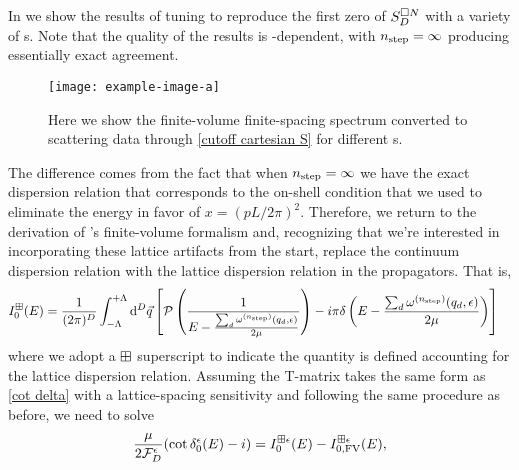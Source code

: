 In  we show the results of tuning to reproduce the first zero of $S_D^{\square N}$ with a variety of {\nstep}s.
Note that the quality of the results is \nstep-dependent, with ${n_\text{step}}=\infty$ producing essentially exact agreement.

\begin{figure}
    \texttt{[image: example-image-a]}
    \caption{Here we show the finite-volume finite-spacing spectrum converted to scattering data through \eqref{cutoff cartesian S} for different {\nstep}s.
    }
    \label{fig:results cutoff cartesian S}
\end{figure}

The difference comes from the fact that when ${n_\text{step}}=\infty$ we have the exact dispersion relation that corresponds to the on-shell condition that we used to eliminate the energy in favor of $x=(pL/2\pi)^2$.
Therefore, we return to the derivation of \Luscher's finite-volume formalism and, recognizing that we're interested in incorporating these lattice artifacts from the start, replace the continuum dispersion relation with the lattice dispersion relation in the propagators.
That is,
\begin{align}
    \label{eq:dispersion I0}
    I_0^{\boxplus}(E)
    &=\frac{1}{(2\pi)^D}
    \int_{-\Lambda}^{+\Lambda}
        \mathrm{d}^D \vec{q}
        \left[
            \mathcal{P} \left( \frac { 1 } { E - \frac{\sum_d \omega^{({n_\text{step}})}(q_d,\epsilon)}{2\mu} } \right)
            -i \pi \delta\left(E - \frac{\sum_d \omega^{({n_\text{step}})}(q_d, \epsilon)}{2\mu}\right)
        \right]
\end{align}
where we adopt a $\boxplus$ superscript to indicate the quantity is defined accounting for the lattice dispersion relation.
Assuming the T-matrix takes the same form as \eqref{cot delta} with a lattice-spacing sensitivity and following the same procedure as before, we need to solve
\begin{equation}
    \frac{\mu}{2\mathcal{F}_D^\epsilon}(\cot \delta_0^\epsilon(E) - i) = I_0^{\boxplus \epsilon}(E) - I_{0,\textrm{FV}}^{\boxplus \epsilon}(E),
\end{equation}
